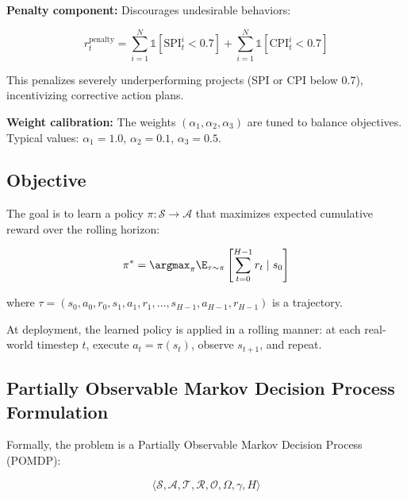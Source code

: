 \textbf{Penalty component:} Discourages undesirable behaviors:

\begin{equation}
r_t^{\text{penalty}} = \sum_{i=1}^N \mathbb{1}[\text{SPI}_t^i < 0.7] + \sum_{i=1}^N \mathbb{1}[\text{CPI}_t^i < 0.7]
\end{equation}

This penalizes severely underperforming projects (SPI or CPI below 0.7), incentivizing corrective action plans.

\textbf{Weight calibration:} The weights $(\alpha_1, \alpha_2, \alpha_3)$ are tuned to balance objectives. Typical values: $\alpha_1 = 1.0$, $\alpha_2 = 0.1$, $\alpha_3 = 0.5$.

\subsection{Objective}

The goal is to learn a policy $\pi: \mathcal{S} \to \mathcal{A}$ that maximizes expected cumulative reward over the rolling horizon:

\begin{equation}
\pi^* = \argmax_\pi \E_{\tau \sim \pi} \left[\sum_{t=0}^{H-1} r_t \mid s_0\right]
\end{equation}

where $\tau = (s_0, a_0, r_0, s_1, a_1, r_1, \ldots, s_{H-1}, a_{H-1}, r_{H-1})$ is a trajectory.

At deployment, the learned policy is applied in a rolling manner: at each real-world timestep $t$, execute $a_t = \pi(s_t)$, observe $s_{t+1}$, and repeat.

\subsection{Partially Observable Markov Decision Process Formulation}

Formally, the problem is a Partially Observable Markov Decision Process (POMDP):

\begin{equation}
\langle \mathcal{S}, \mathcal{A}, \mathcal{T}, \mathcal{R}, \mathcal{O}, \Omega, \gamma, H \rangle
\end{equation}

